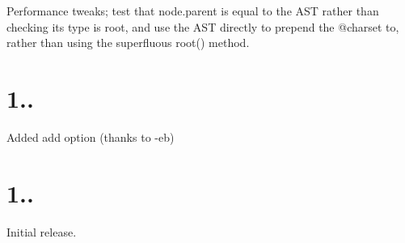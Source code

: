 
\begin{DoxyItemize}
\item Performance tweaks; test that {\ttfamily node.\+parent} is equal to the A\+ST rather than checking its type is {\ttfamily root}, and use the A\+ST directly to prepend the {\ttfamily @charset} to, rather than using the superfluous {\ttfamily root()} method.
\end{DoxyItemize}

\section*{1..}


\begin{DoxyItemize}
\item Added {\ttfamily add} option (thanks to -\/eb)
\end{DoxyItemize}

\section*{1..}


\begin{DoxyItemize}
\item Initial release. 
\end{DoxyItemize}